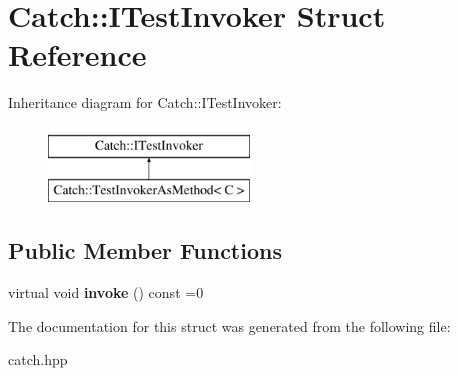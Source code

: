 \hypertarget{struct_catch_1_1_i_test_invoker}{}\section{Catch\+:\+:I\+Test\+Invoker Struct Reference}
\label{struct_catch_1_1_i_test_invoker}
Inheritance diagram for Catch\+:\+:I\+Test\+Invoker\+:\begin{figure}[H]
\begin{center}
\leavevmode
\includegraphics[height=2.000000cm]{struct_catch_1_1_i_test_invoker}
\end{center}
\end{figure}
\subsection*{Public Member Functions}
\begin{DoxyCompactItemize}
\item 
\mbox{\label{struct_catch_1_1_i_test_invoker_a6fcd5c5b67d6d5ade6491ff33411ca7f}} 
virtual void {\bfseries invoke} () const =0
\end{DoxyCompactItemize}


The documentation for this struct was generated from the following file\+:\begin{DoxyCompactItemize}
\item 
catch.\+hpp\end{DoxyCompactItemize}
